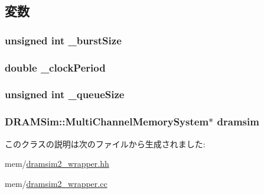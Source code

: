 \subsection{変数}
\hypertarget{classDRAMSim2Wrapper_a5164bcd378cd3ca479f3df831726f5da}{
\subsubsection[{\_\-burstSize}]{\setlength{\rightskip}{0pt plus 5cm}unsigned int {\bf \_\-burstSize}}}
\label{classDRAMSim2Wrapper_a5164bcd378cd3ca479f3df831726f5da}
\hypertarget{classDRAMSim2Wrapper_aba0cb71192619554d50451635e5d6a52}{
\subsubsection[{\_\-clockPeriod}]{\setlength{\rightskip}{0pt plus 5cm}double {\bf \_\-clockPeriod}}}
\label{classDRAMSim2Wrapper_aba0cb71192619554d50451635e5d6a52}
\hypertarget{classDRAMSim2Wrapper_a16dbba262c462bdaa1a3e55e1d69968c}{
\subsubsection[{\_\-queueSize}]{\setlength{\rightskip}{0pt plus 5cm}unsigned int {\bf \_\-queueSize}}}
\label{classDRAMSim2Wrapper_a16dbba262c462bdaa1a3e55e1d69968c}
\hypertarget{classDRAMSim2Wrapper_ab3fdccad236992bb048094aa3fb52893}{
\subsubsection[{dramsim}]{\setlength{\rightskip}{0pt plus 5cm}DRAMSim::MultiChannelMemorySystem$\ast$ {\bf dramsim}}}
\label{classDRAMSim2Wrapper_ab3fdccad236992bb048094aa3fb52893}


このクラスの説明は次のファイルから生成されました:\begin{DoxyCompactItemize}
\item 
mem/\hyperlink{dramsim2__wrapper_8hh}{dramsim2\_\-wrapper.hh}\item 
mem/\hyperlink{dramsim2__wrapper_8cc}{dramsim2\_\-wrapper.cc}\end{DoxyCompactItemize}
